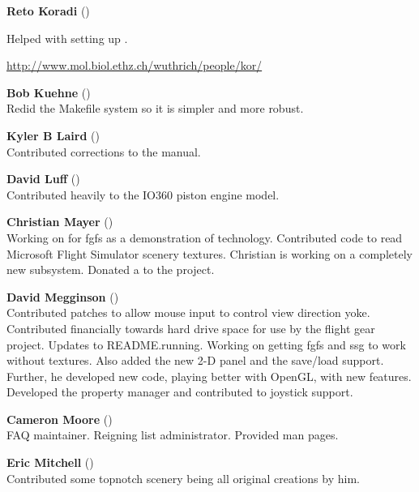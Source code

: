 \noindent \textbf{Reto Koradi} ()
 \medskip

  Helped with setting up .
 \medskip

\href{http://www.mol.biol.ethz.ch/wuthrich/people/kor/}{http://www.mol.biol.ethz.ch/wuthrich/people/kor/}
 \medskip

\noindent \textbf{Bob Kuehne} ()\\
  Redid the Makefile system so it is simpler and more robust.
 \medskip

\noindent \textbf{Kyler B Laird} ()\\
 Contributed corrections to the manual.
 \medskip

\noindent \textbf{David Luff} ()\\
 Contributed heavily to the IO360 piston engine model.
 \medskip

\noindent \textbf{Christian Mayer}
()\\
 Working on  for fgfs as a demonstration of technology.
 Contributed code to read Microsoft Flight Simulator scenery textures. Christian is working on a completely new  subsystem.
 Donated a  to the project.
 \medskip

\noindent \textbf{David Megginson} ()\\
  Contributed patches to allow mouse input to control view direction yoke.
  Contributed financially towards hard drive space for use by the
  flight gear project. Updates to README.running.
  Working on getting fgfs and ssg to work without textures.
  Also added the new 2-D panel and the save/load support.
  Further, he developed new  code, playing better with OpenGL, with new features.
  Developed the property manager and contributed to joystick support.
 \medskip

 \medskip

\noindent \textbf{Cameron Moore}
()\\
 FAQ maintainer. Reigning list administrator. Provided man pages.
 \medskip

\noindent \textbf{Eric Mitchell} ()\\
  Contributed some topnotch scenery  being all original creations by him.
 \medskip

